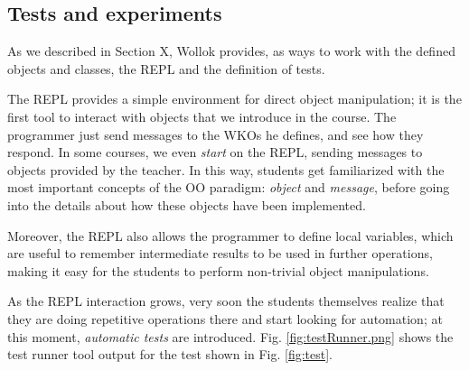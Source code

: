 \subsection{Tests and experiments}
As we described in Section X, Wollok provides, as ways to work with the defined objects and classes, the REPL and the definition of tests.

The REPL provides a simple environment for direct object manipulation; it is the first tool to interact with objects that we introduce in the course.
The programmer just send messages to the WKOs he defines, and see how they respond. 
In some courses, we even \emph{start} on the REPL, sending messages to objects provided by the teacher.
In this way, students get familiarized with the most important concepts of the OO paradigm: \emph{object} and \emph{message}, before going into the details about how these objects have been implemented.

Moreover, the REPL also allows the programmer to define local variables, which are useful to remember intermediate results to be used in further operations, making it easy for the students to perform non-trivial object manipulations.


\medskip
As the REPL interaction grows, very soon the students themselves realize that they are doing repetitive operations there and start looking for automation;
at this moment, \emph{automatic tests} are introduced.
Fig. \ref{fig:testRunner.png} shows the test runner tool output for the test shown in Fig. \ref{fig:test}.

